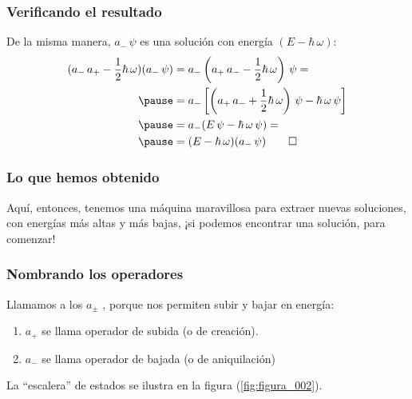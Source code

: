 \documentclass[12pt]{beamer}
\begin{document}
\begin{frame}
\frametitle{Verificando el resultado}
De la misma manera, $a_{-} \, \psi$ es una solución con energía $(E - \hbar \, \omega)$:
\pause
\begin{eqnarray*}
\begin{aligned}
(a_{-} \, a_{+} - \dfrac{1}{2} \hbar \, \omega) (a_{-} \, \psi) &= a_{-} \left( a_{+} \, a_{-} - \dfrac{1}{2} \hbar \, \omega \right) \, \psi = \\ \pause
&= a_{-} \left[ \left( a_{+} \, a_{-} + \dfrac{1}{2} \hbar \, \omega \right) \, \psi - \hbar \, \omega \, \psi \right] \\ \pause
&= a_{-} (E \, \psi - \hbar \, \omega \, \psi) = \\ \pause
&= (E - \hbar \, \omega) (a_{-} \, \psi) \qed
\end{aligned}
\end{eqnarray*}
\end{frame}
\begin{frame}
\frametitle{Lo que hemos obtenido}
Aquí, entonces, tenemos una máquina maravillosa para extraer nuevas soluciones, con energías más altas y más bajas, ¡si podemos encontrar una solución, para comenzar!
\end{frame}
\begin{frame}
\frametitle{Nombrando los operadores}
Llamamos a los $a_{\pm}$ , porque nos permiten subir y bajar en energía:
\pause
{}
\begin{enumerate}[<+->]
\item $a_{+}$ se llama operador de subida (o de creación).
\item $a_{-}$ se llama operador de bajada (o de aniquilación) 
\end{enumerate}
\pause
La \enquote{escalera} de estados se ilustra en la figura (\ref{fig:figura_002}).
\end{frame}
\end{document}
